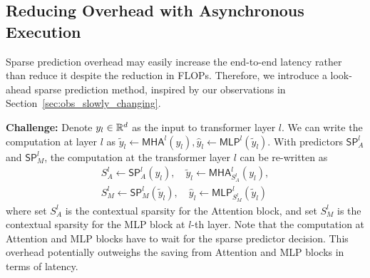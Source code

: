 




\subsection{Reducing Overhead with Asynchronous Execution}
\label{sec:hide_overhead}
Sparse prediction overhead may easily increase the end-to-end latency rather than reduce it despite the reduction in FLOPs. Therefore, we introduce a look-ahead sparse prediction method, inspired by our observations in Section~\ref{sec:obs_slowly_changing}.

\textbf{Challenge:} Denote $y_l\in \mathbb{R}^{d}$ as the input to transformer layer $l$. We can write the computation at layer $l$ as
$
    \widetilde{y}_l \leftarrow \mathsf{MHA}^{l}(y_l),
    \widehat{y}_l \leftarrow \mathsf{MLP}^{l}(\widetilde{y}_l)
$.
With predictors $\mathsf{SP}_A^l$ and $\mathsf{SP}_M^l$, the computation at the transformer layer $l$ can be re-written as 
\begin{align*}
    S_A^l  \leftarrow \mathsf{SP}_A^{l}(y_l), \quad
    \widetilde{y}_l \leftarrow \mathsf{MHA}^{l}_{S_A^l}(y_l), \\
    S_M^l \leftarrow \mathsf{SP}_M^{l}(\widetilde{y}_l ), \quad
    \widehat{y}_l \leftarrow \mathsf{MLP}^{l}_{S_M^l}( \widetilde{y}_l)
\end{align*}
where set $S_A^l$ is the contextual sparsity for the Attention block, and set $S_M^l$ is the contextual sparsity for the MLP block at $l$-th layer.
Note that the computation at Attention and MLP blocks have to wait for the sparse predictor decision. This overhead potentially outweighs the saving from Attention and MLP blocks in terms of latency. 

